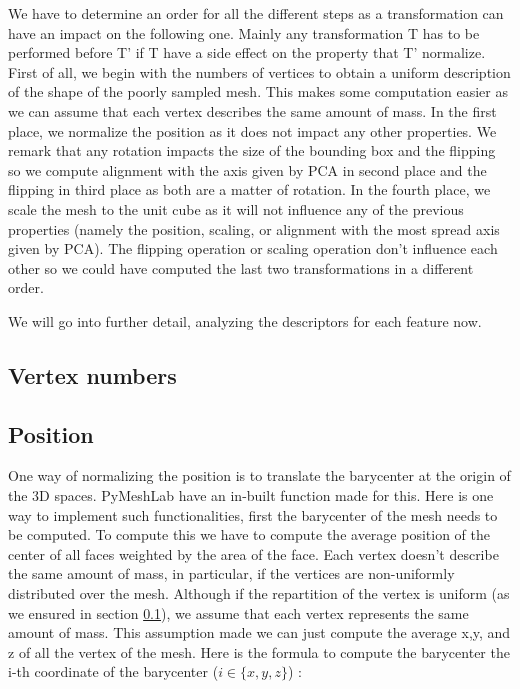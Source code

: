 \documentclass[10pt,twocolumn,letterpaper]{article}
\begin{document}
	We have to determine an order for all the different steps as a transformation can have an impact on the following one. Mainly any transformation T has to be performed before T' if T have a side effect on the property that T' normalize. First of all, we begin with the numbers of vertices to obtain a uniform description of the shape of the poorly sampled mesh. This makes some computation easier as we can assume that each vertex describes the same amount of mass. In the first place, we normalize the position as it does not impact any other properties. We remark that any rotation impacts the size of the bounding box and the flipping so we compute alignment with the axis given by PCA in second place and the flipping in third place as both are a matter of rotation. In the fourth place, we scale the mesh to the unit cube as it will not influence any of the previous properties (namely the position, scaling, or alignment with the most spread axis given by PCA). The flipping operation or scaling operation don't influence each other so we could have computed the last two transformations in a different order.
	
We will go into further detail, analyzing the descriptors for each feature now.


\subsection{Vertex numbers}
\label{subsec:vertex numbers}

\subsection{Position}

One way of normalizing the position is to translate the barycenter at the origin of the 3D spaces. PyMeshLab have an in-built function made for this. Here is one way to implement such functionalities, first the barycenter of the mesh needs to be computed. To compute this we have to compute the average position of the center of all faces weighted by the area of the face. Each vertex doesn’t describe the same amount of mass, in particular, if the vertices are non-uniformly distributed over the mesh.  Although if the repartition of the vertex is uniform (as we ensured in section \ref{subsec:vertex numbers}), we assume that each vertex represents the same amount of mass. This assumption made we can just compute the average x,y, and z of all the vertex of the mesh. Here is the formula to compute the barycenter the i-th coordinate of the barycenter ($i \in \{x,y,z\}$) :
\end{document}
